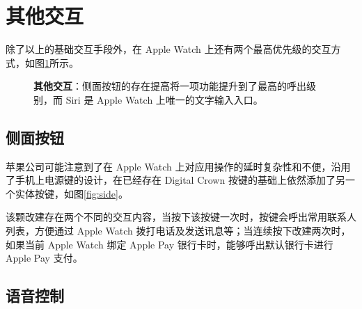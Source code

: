 \section{其他交互}

除了以上的基础交互手段外，在 Apple Watch 上还有两个最高优先级的交互方式，如图\ref{fig:others}所示。

\begin{figure}[H]
\centering
{}
\caption{\textbf{其他交互}：侧面按钮的存在提高将一项功能提升到了最高的呼出级别，而 Siri 是 Apple Watch 上唯一的文字输入入口。}
\label{fig:others}
\end{figure}

\subsection{侧面按钮}

苹果公司可能注意到了在 Apple Watch 上对应用操作的延时复杂性和不便，沿用了手机上电源键的设计，在已经存在 Digital Crown 按键的基础上依然添加了另一个实体按键，如图\ref{fig:side}。

该颗改建存在两个不同的交互内容，当按下该按键一次时，按键会呼出常用联系人列表，方便通过 Apple Watch 拨打电话及发送讯息等；当连续按下改建两次时，如果当前 Apple Watch 绑定 Apple Pay 银行卡时，能够呼出默认银行卡进行 Apple Pay 支付。

\subsection{语音控制}

